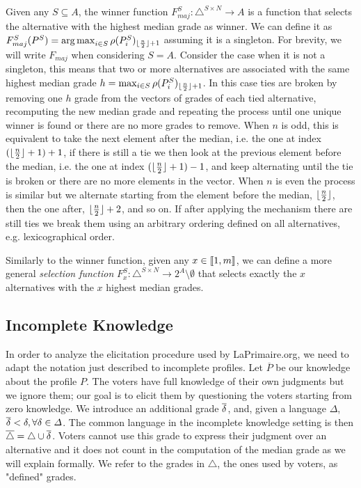 \documentclass[version=3.21, pagesize, twoside=off, bibliography=totoc, DIV=calc, fontsize=12pt, a4paper]{scrartcl}
\begin{document}
Given any $S\subseteq A$, the winner function $F^S_{maj}:\triangle^{S \times N} \rightarrow A$ %
is a function that selects the alternative with the highest median grade as winner. We can define it as $F^S_{maj}(P^S) = \operatorname*{arg\,max}_{i\in S}\rho(P^S_i)_{\lfloor\frac{n}{2}\rfloor+ 1}$ assuming it is a singleton. For brevity, we will write $F_{maj}$ when considering $S=A$. Consider the case when it is not a singleton, this means that two or more alternatives are associated with the same highest median grade $h=\max_{i\in S}\rho(P^S_i)_{\lfloor\frac{n}{2}\rfloor + 1}$. In this case ties are broken by removing one $h$ grade from the vectors of grades of each tied alternative, recomputing the new median grade and repeating the process until one unique winner is found or there are no more grades to remove. When $n$ is odd, this is equivalent to take the next element after the median, i.e. the one at index $(\lfloor\frac{n}{2}\rfloor + 1) +1$, if there is still a tie we then look at the previous element before the median, i.e. the one at index $(\lfloor\frac{n}{2}\rfloor + 1) -1$, and keep alternating until the tie is broken or there are no more elements in the vector. When $n$ is even the process is similar but we alternate starting from the element before the median, $\lfloor\frac{n}{2}\rfloor$, then the one after, $\lfloor\frac{n}{2}\rfloor + 2$, and so on.  If after applying the mechanism there are still ties we break them using an arbitrary ordering defined on all alternatives, e.g. lexicographical order.

Similarly to the winner function, given any $x \in \llbracket1,m\rrbracket$, we can define a more general \emph{selection function} $F^S_x:\triangle^{S\times N} \rightarrow 2^A \setminus \emptyset$ that selects exactly the $x$ alternatives with the $x$ highest median grades.

\subsection{Incomplete Knowledge}
In order to analyze the elicitation procedure used by LaPrimaire.org, we need to adapt the notation just described to incomplete profiles. 
 Let $\overline{P}$ be our knowledge about the profile $P$.
The voters have full knowledge of their own judgments but we ignore them; our goal is to elicit them by questioning the voters starting from zero knowledge.
We introduce an additional grade $\overline{\delta}$, and, given a language $\Delta$, $\overline{\delta}< \delta, \forall \delta \in \Delta$.  The common language in the incomplete knowledge setting is then $\overline{\triangle}=\triangle \cup \overline{\delta}$. Voters cannot use this grade to express their judgment over an alternative and it does not count in the computation of the median grade as we will explain formally. We refer to the grades in $\triangle$, the ones used by voters, as "defined" grades.
\end{document}
